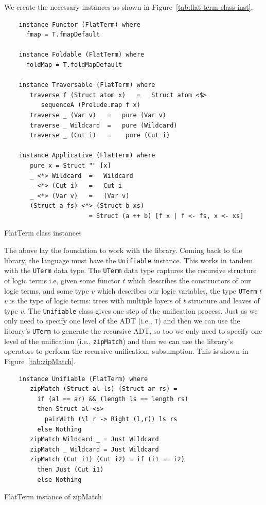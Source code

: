 \documentclass[thesis-solanki.tex]{subfiles}
\begin{document}
We create the necessary instances
as shown in Figure~\ref{tab:flat-term-class-inst}.
\begin{code-list}
  \begin{verbatim}
    instance Functor (FlatTerm) where
      fmap = T.fmapDefault

    instance Foldable (FlatTerm) where
      foldMap = T.foldMapDefault

    instance Traversable (FlatTerm) where
       traverse f (Struct atom x)   =   Struct atom <$>
          sequenceA (Prelude.map f x)
       traverse _ (Var v)   =   pure (Var v)
       traverse _ Wildcard  =   pure (Wildcard)
       traverse _ (Cut i)   =    pure (Cut i)

    instance Applicative (FlatTerm) where
       pure x = Struct "" [x]
       _ <*> Wildcard  =   Wildcard
       _ <*> (Cut i)   =   Cut i
       _ <*> (Var v)   =   (Var v)
       (Struct a fs) <*> (Struct b xs)
                       = Struct (a ++ b) [f x | f <- fs, x <- xs]
  \end{verbatim}
  \caption{FlatTerm class instances}
  \label{tab:flat-term-class-inst}
\end{code-list}

The above lay the foundation to work with the library.
Coming back to the library, the language must have the \Verb!Unifiable! instance.
This works in tandem with the \Verb!UTerm! data type.
The \Verb!UTerm! data type captures the recursive structure of logic terms i.e, given some functor \(t\) which describes the
constructors of our logic terms, and some type \(v\) which describes our logic variables, the type
\Verb!UTerm! \(t\) \(v\) is the
type of logic terms: trees with multiple layers of \(t\) structure and leaves of type \(v\).
The \Verb!Unifiable! class gives one step of the unification process.
Just as we only need to specify one level of the ADT (i.e., \Verb!T!) and then we can use the library's \Verb!UTerm! to generate
the recursive ADT, so too we only need to specify one level of the unification (i.e., \Verb!zipMatch!) and then we can use
the library's operators to perform the recursive unification, subsumption.
This is shown in Figure~\ref{tab:zipMatch}.
\begin{code-list}
  \begin{verbatim}
    instance Unifiable (FlatTerm) where
       zipMatch (Struct al ls) (Struct ar rs) =
         if (al == ar) && (length ls == length rs)
         then Struct al <$>
           pairWith (\l r -> Right (l,r)) ls rs
         else Nothing
       zipMatch Wildcard _ = Just Wildcard
       zipMatch _ Wildcard = Just Wildcard
       zipMatch (Cut i1) (Cut i2) = if (i1 == i2)
         then Just (Cut i1)
         else Nothing
  \end{verbatim}
  \vspace*{-0.5\baselineskip}
  \caption{FlatTerm instance of zipMatch}
  \label{tab:zipMatch}
\end{code-list}
\end{document}
